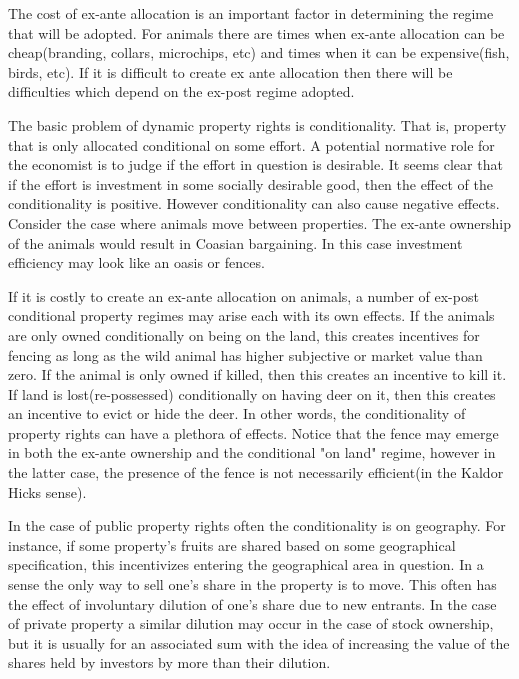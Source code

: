 \documentclass[12pt]{article}
\numberwithin{equation}{section}
\begin{document}
The cost of ex-ante allocation is an important factor in determining the regime that will be adopted. For animals there are times when ex-ante allocation can be cheap(branding, collars, microchips, etc) and times when it can be expensive(fish, birds, etc). If it is difficult to create ex ante allocation then there will be difficulties which depend on the ex-post regime adopted.

The basic problem of dynamic property rights is conditionality. That is, property that is only allocated conditional on some effort. A potential normative role for the economist is to judge if the effort in question is desirable. It seems clear that if the effort is investment in some socially desirable good, then the effect of the conditionality is positive. However conditionality can also cause negative effects. Consider the case where animals move between properties. The ex-ante ownership of the animals would result in Coasian bargaining. In this case investment efficiency may look like an oasis or fences.


If it is costly to create an ex-ante allocation on animals, a number of ex-post conditional property regimes may arise each with its own effects. If the animals are only owned conditionally on being on the land, this creates incentives for fencing as long as the wild animal has higher subjective or market value than zero. If the animal is only owned if killed, then this creates an incentive to kill it. If land is lost(re-possessed) conditionally on having deer on it, then this creates an incentive to evict or hide the deer. In other words, the conditionality of property rights can have a plethora of effects. Notice that the fence may emerge in both the ex-ante ownership and the conditional "on land" regime, however in the latter case, the presence of the fence is not necessarily efficient(in the Kaldor Hicks sense).


In the case of public property rights often the conditionality is on geography. For instance, if some property's fruits are shared based on some geographical specification, this incentivizes entering the geographical area in question. In a sense the only way to sell one's share in the property is to move. This often has the effect of involuntary dilution of one's share due to new entrants. In the case of private property a similar dilution may occur in the case of stock ownership, but it is usually for an associated sum with the idea of increasing the value of the shares held by investors by more than their dilution.
\end{document}
